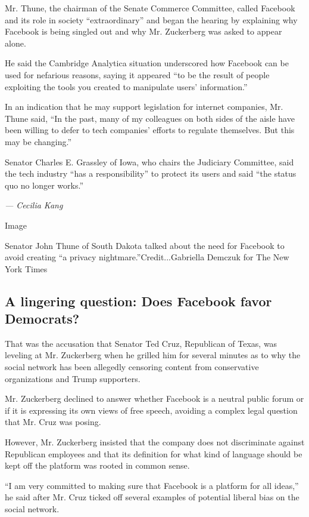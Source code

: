 Mr. Thune, the chairman of the Senate Commerce Committee, called
Facebook and its role in society ``extraordinary'' and began the hearing
by explaining why Facebook is being singled out and why Mr. Zuckerberg
was asked to appear alone.

He said the Cambridge Analytica situation underscored how Facebook can
be used for nefarious reasons, saying it appeared ``to be the result of
people exploiting the tools you created to manipulate users'
information.''

In an indication that he may support legislation for internet companies,
Mr. Thune said, ``In the past, many of my colleagues on both sides of
the aisle have been willing to defer to tech companies' efforts to
regulate themselves. But this may be changing.''

Senator Charles E. Grassley of Iowa, who chairs the Judiciary Committee,
said the tech industry ``has a responsibility'' to protect its users and
said ``the status quo no longer works.''

\emph{--- Cecilia Kang}

Image

Senator John Thune of South Dakota talked about the need for Facebook to
avoid creating ``a privacy nightmare.''Credit...Gabriella Demczuk for
The New York Times

\hypertarget{a-lingering-question-does-facebook-favor-democrats}{%
\subsection{A lingering question: Does Facebook favor
Democrats?}\label{a-lingering-question-does-facebook-favor-democrats}}

That was the accusation that Senator Ted Cruz, Republican of Texas, was
leveling at Mr. Zuckerberg when he grilled him for several minutes as to
why the social network has been allegedly censoring content from
conservative organizations and Trump supporters.

Mr. Zuckerberg declined to answer whether Facebook is a neutral public
forum or if it is expressing its own views of free speech, avoiding a
complex legal question that Mr. Cruz was posing.

However, Mr. Zuckerberg insisted that the company does not discriminate
against Republican employees and that its definition for what kind of
language should be kept off the platform was rooted in common sense.

``I am very committed to making sure that Facebook is a platform for all
ideas,'' he said after Mr. Cruz ticked off several examples of potential
liberal bias on the social network.

